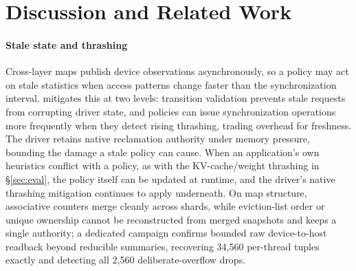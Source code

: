\section{Discussion and Related Work}
\label{sec:related}

\paragraph{Stale state and thrashing}
Cross-layer maps publish device observations asynchronously, so a policy may act on stale statistics when access patterns change faster than the synchronization interval.
\sys{} mitigates this at two levels: transition validation prevents stale requests from corrupting driver state, and policies can issue synchronization operations more frequently when they detect rising thrashing, trading overhead for freshness.
The driver retains native reclamation authority under memory pressure, bounding the damage a stale policy can cause.
When an application's own heuristics conflict with a policy, as with the KV-cache/weight thrashing in \S\ref{sec:eval}, the policy itself can be updated at runtime, and the driver's native thrashing mitigation continues to apply underneath.
On map structure, associative counters merge cleanly across shards, while eviction-list order or unique ownership cannot be reconstructed from merged snapshots and keeps a single authority; a dedicated campaign confirms bounded raw device-to-host readback beyond reducible summaries, recovering 34{,}560 per-thread tuples exactly and detecting all 2{,}560 deliberate-overflow drops.

